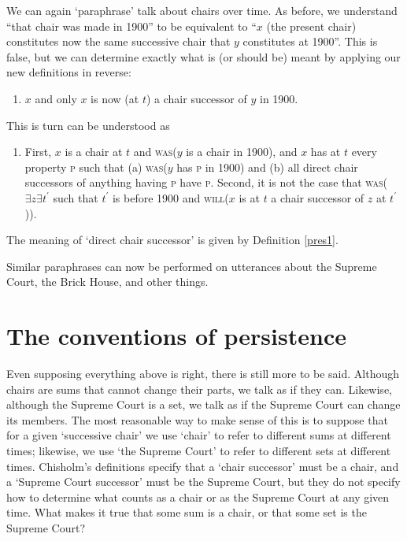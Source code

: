 \documentclass[11pt]{article}
\begin{document}
\begin{spacing}{1.5}
We can again `paraphrase' talk about chairs over time.  As before, we
understand ``that chair was made in 1900'' to be equivalent to ``$x$
(the present chair) constitutes now the same successive chair that $y$
constitutes at 1900''.  This is false, but we can determine exactly
what is (or should be) meant by applying our new definitions in
reverse:

\begin{enumerate}[label=3a.]
  \item $x$ and only $x$ is now (at $t$) a chair successor of $y$ in
    1900.
\end{enumerate}
This is turn can be understood as

\begin{enumerate}[label=2a.]
  \item First, $x$ is a chair at $t$ and \textsc{was}($y$ is a chair
    in 1900), and $x$ has at $t$ every property \textsc{p} such that
    (a) \textsc{was}($y$ has \textsc{p} in 1900) and (b) all direct
    chair successors of anything having \textsc{p} have \textsc{p}.
    Second, it is not the case that \textsc{was}($\exists z \exists
    t^{\prime}$ such that $t^{\prime}$ is before 1900 and
    \textsc{will}($x$ is at $t$ a chair successor of $z$ at
    $t^{\prime}$)).
\end{enumerate}
The meaning of `direct chair successor' is given by Definition
\ref{pres1}.

Similar paraphrases can now be performed on utterances about the
Supreme Court, the Brick House, and other things.

\section{The conventions of persistence}
\label{set-convention}
Even supposing everything above is right, there is still more to be
said.  Although chairs are sums that cannot change their parts, we
talk as if they can.  Likewise, although the Supreme Court is a set,
we talk as if the Supreme Court can change its members.  The most
reasonable way to make sense of this is to suppose that for a given
`successive chair' we use `chair' to refer to different sums at
different times; likewise, we use `the Supreme Court' to refer to
different sets at different times.  Chisholm's definitions specify
that a `chair successor' must be a chair, and a `Supreme Court
successor' must be the Supreme Court, but they do not specify how to
determine what counts as a chair or as the Supreme Court at any given
time.  What makes it true that some sum is a chair, or that some set
is the Supreme Court?


\end{spacing}
\end{document}
